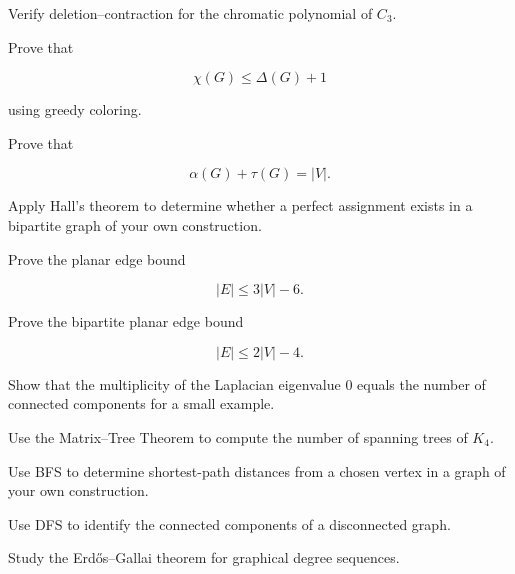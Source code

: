 \begin{exercise}[3]
Verify deletion--contraction for the chromatic polynomial of \(C_3\).
\end{exercise}

\begin{exercise}[3]
Prove that

\[
\chi(G)\leq\Delta(G)+1
\]

using greedy coloring.
\end{exercise}

\begin{exercise}[3]
Prove that

\[
\alpha(G)+\tau(G)=|V|.
\]
\end{exercise}

\begin{exercise}[3]
Apply Hall's theorem to determine whether a perfect assignment exists
in a bipartite graph of your own construction.
\end{exercise}

\begin{exercise}[3]
Prove the planar edge bound

\[
|E|\leq3|V|-6.
\]
\end{exercise}

\begin{exercise}[3]
Prove the bipartite planar edge bound

\[
|E|\leq2|V|-4.
\]
\end{exercise}

\begin{exercise}[3]
Show that the multiplicity of the Laplacian eigenvalue \(0\) equals the
number of connected components for a small example.
\end{exercise}

\begin{exercise}[3]
Use the Matrix--Tree Theorem to compute the number of spanning trees of
\(K_4\).
\end{exercise}

\begin{exercise}[3]
Use BFS to determine shortest-path distances from a chosen vertex in a
graph of your own construction.
\end{exercise}

\begin{exercise}[3]
Use DFS to identify the connected components of a disconnected graph.
\end{exercise}

\begin{exercise}[4]
Study the Erd\H{o}s--Gallai theorem for graphical degree sequences.
\end{exercise}

